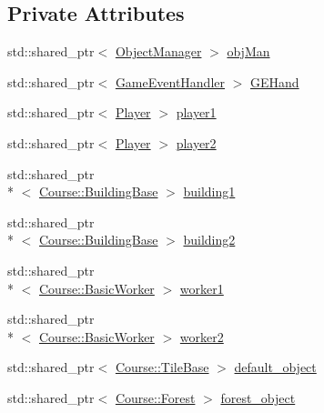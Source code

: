 \subsection*{Private Attributes}
\begin{DoxyCompactItemize}
\item 
std\-::shared\-\_\-ptr$<$ \hyperlink{classGame_1_1ObjectManager}{Object\-Manager} $>$ \hyperlink{classdefault__tile_a8749ee4ac9c528916c2fd835ce14f043}{obj\-Man}
\item 
std\-::shared\-\_\-ptr$<$ \hyperlink{classGame_1_1GameEventHandler}{Game\-Event\-Handler} $>$ \hyperlink{classdefault__tile_ac2682ad79db9879a601bc5bdd24add2c}{G\-E\-Hand}
\item 
std\-::shared\-\_\-ptr$<$ \hyperlink{classGame_1_1Player}{Player} $>$ \hyperlink{classdefault__tile_adeba3a9d85b478d7cd0dbd5b6194ede3}{player1}
\item 
std\-::shared\-\_\-ptr$<$ \hyperlink{classGame_1_1Player}{Player} $>$ \hyperlink{classdefault__tile_ad7407fc63175dce0d369ddcc261194a6}{player2}
\item 
std\-::shared\-\_\-ptr\\*
$<$ \hyperlink{classCourse_1_1BuildingBase}{Course\-::\-Building\-Base} $>$ \hyperlink{classdefault__tile_a1428f399558ca156afbc754ae04fe6d0}{building1}
\item 
std\-::shared\-\_\-ptr\\*
$<$ \hyperlink{classCourse_1_1BuildingBase}{Course\-::\-Building\-Base} $>$ \hyperlink{classdefault__tile_a6cff7bada2d7f8f055225d1442fc0d6d}{building2}
\item 
std\-::shared\-\_\-ptr\\*
$<$ \hyperlink{classCourse_1_1BasicWorker}{Course\-::\-Basic\-Worker} $>$ \hyperlink{classdefault__tile_a15da0582e401dfe74e37fc3d6e27931a}{worker1}
\item 
std\-::shared\-\_\-ptr\\*
$<$ \hyperlink{classCourse_1_1BasicWorker}{Course\-::\-Basic\-Worker} $>$ \hyperlink{classdefault__tile_ace6e1dbaff450508a5889ccc10190da5}{worker2}
\item 
std\-::shared\-\_\-ptr$<$ \hyperlink{classCourse_1_1TileBase}{Course\-::\-Tile\-Base} $>$ \hyperlink{classdefault__tile_af0e444a7cbe271a0eca9a245fcd938ff}{default\-\_\-object}
\item 
std\-::shared\-\_\-ptr$<$ \hyperlink{classCourse_1_1Forest}{Course\-::\-Forest} $>$ \hyperlink{classdefault__tile_aed6aefdcd6b8d7ebf30d586e9143d44f}{forest\-\_\-object}
\item 

\end{DoxyCompactItemize}
